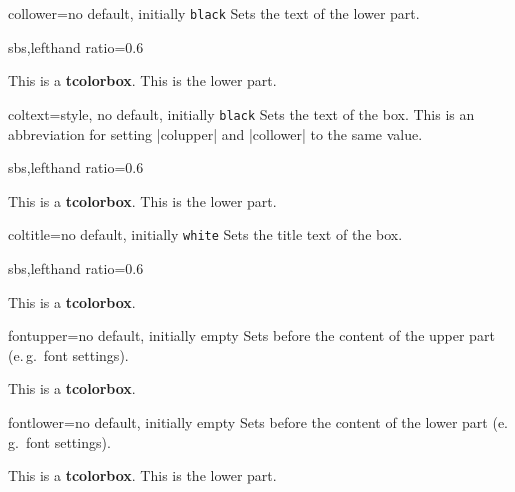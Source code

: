 \begin{docTcbKey}{collower}{=}{no default, initially \texttt{black}}
  Sets the text  of the lower part.
\begin{dispExample*}{sbs,lefthand ratio=0.6}
\begin{tcolorbox}[collower=red!75!black]
This is a \textbf{tcolorbox}.
\tcblower
This is the lower part.
\end{tcolorbox}
\end{dispExample*}
\end{docTcbKey}


\begin{docTcbKey}{coltext}{=}{style, no default, initially \texttt{black}}
  Sets the text  of the box. This is an abbreviation for setting
  |colupper| and |collower| to the same value.
\begin{dispExample*}{sbs,lefthand ratio=0.6}
\begin{tcolorbox}[coltext=red!75!black]
This is a \textbf{tcolorbox}.
\tcblower
This is the lower part.
\end{tcolorbox}
\end{dispExample*}
\end{docTcbKey}


\begin{docTcbKey}{coltitle}{=}{no default, initially \texttt{white}}
  Sets the title text  of the box.
\begin{dispExample*}{sbs,lefthand ratio=0.6}
\begin{tcolorbox}[coltitle=red!75!black,
  colbacktitle=black!10!white,title=Test]
This is a \textbf{tcolorbox}.
\end{tcolorbox}
\end{dispExample*}
\end{docTcbKey}

\clearpage

\begin{docTcbKey}{fontupper}{=}{no default, initially empty}
  Sets  before the content of the upper part (e.\,g.\ font settings).
\begin{dispExample}
\begin{tcolorbox}[fontupper=Hello!~\sffamily]
This is a \textbf{tcolorbox}.
\end{tcolorbox}
\end{dispExample}
\end{docTcbKey}


\begin{docTcbKey}{fontlower}{=}{no default, initially empty}
  Sets  before the content of the lower part (e.\,g.\ font settings).
\begin{dispExample}
\begin{tcolorbox}[fontlower=\sffamily\bfseries]
This is a \textbf{tcolorbox}.
\tcblower
This is the lower part.
\end{tcolorbox}
\end{dispExample}
\end{docTcbKey}


